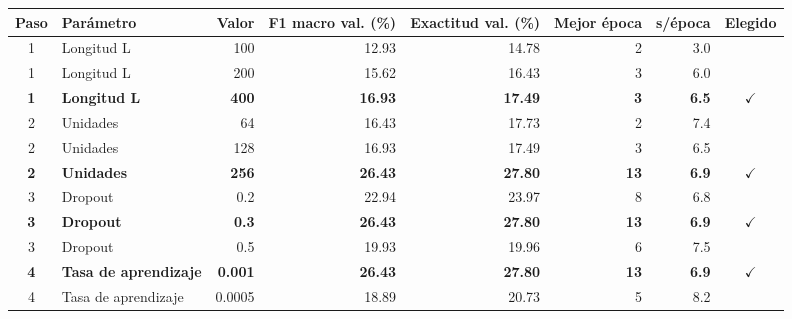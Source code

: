 \begin{tabular}{clrrrrrc}
\toprule
Paso & Parámetro & Valor & F1 macro val. (\%) & Exactitud val. (\%) & Mejor época & s/época & Elegido \\
\midrule
1 & Longitud L & 100 & 12.93 & 14.78 & 2 & 3.0 &  \\
1 & Longitud L & 200 & 15.62 & 16.43 & 3 & 6.0 &  \\
\textbf{1} & \textbf{Longitud L} & \textbf{400} & \textbf{16.93} & \textbf{17.49} & \textbf{3} & \textbf{6.5} & \textbf{$\checkmark$} \\
2 & Unidades & 64 & 16.43 & 17.73 & 2 & 7.4 &  \\
2 & Unidades & 128 & 16.93 & 17.49 & 3 & 6.5 &  \\
\textbf{2} & \textbf{Unidades} & \textbf{256} & \textbf{26.43} & \textbf{27.80} & \textbf{13} & \textbf{6.9} & \textbf{$\checkmark$} \\
3 & Dropout & 0.2 & 22.94 & 23.97 & 8 & 6.8 &  \\
\textbf{3} & \textbf{Dropout} & \textbf{0.3} & \textbf{26.43} & \textbf{27.80} & \textbf{13} & \textbf{6.9} & \textbf{$\checkmark$} \\
3 & Dropout & 0.5 & 19.93 & 19.96 & 6 & 7.5 &  \\
\textbf{4} & \textbf{Tasa de aprendizaje} & \textbf{0.001} & \textbf{26.43} & \textbf{27.80} & \textbf{13} & \textbf{6.9} & \textbf{$\checkmark$} \\
4 & Tasa de aprendizaje & 0.0005 & 18.89 & 20.73 & 5 & 8.2 &  \\
\bottomrule
\end{tabular}
